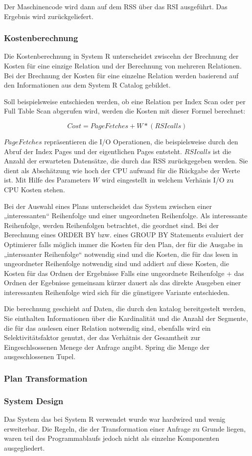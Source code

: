 Der Maschinencode wird dann auf dem \ac{RSS} über das \ac{RSI} ausgeführt.  Das Ergebnis wird zurückgeliefert.

\subsubsection{Kostenberechnung}

Die Kostenberechnung in System R unterscheidet zwiscehn der Brechnung der Kosten für eine einzige Relation und der Berechnung von mehreren Relationen. Bei der Brechnung der Kosten für eine einzelne Relation werden basierend auf den Informationen aus dem System R Catalog gebildet.

Soll beispielsweise entschieden werden, ob eine Relation per Index Scan oder per Full Table Scan abgerufen wird, werden die Kosten mit dieser Formel berechnet:

$$Cost = Page Fetches + W * (RSI calls)$$


$Page Fetches$ repräsentieren die I/O Operationen, die beispielsweise durch den Abruf der Index Pages und der eigentlichen Pages entsteht. $RSI calls$ ist die Anzahl der erwarteten Datensätze, die durch das \ac{RSS} zurückgegeben werden. Sie dient als Abschätzung wie hoch der CPU aufwand für die Rückgabe der Werte ist. Mit Hilfe des Parameters $W$ wird eingestellt in welchem Verhänis I/O zu CPU Kosten stehen.

Bei der Auswahl eines Plans unterscheidet das System zwischen einer „interessanten“ Reihenfolge und einer ungeordneten Reihenfolge. Als interessante Reihenfolge, werden Reihenfolgen betrachtet, die geordnet sind. Bei der Berechnung eines ORDER BY bzw. eines GROUP BY Statements evaluiert der Optimierer falls möglich immer die Kosten für den Plan, der für die Ausgabe in „interssanter Reihenfolge“ notwendig sind und die Kosten, die für das lesen in ungeordneter Reihenfolge notwendig sind und addiert auf diese Kosten, die Kosten für das Ordnen der Ergebnisse Falls eine ungeordnete Reihenfolge + das Ordnen der Egebnisse gemeinsam kürzer dauert als das direkte Ausgeben einer interessanten Reihenfolge wird sich für die günstigere Variante entschieden. 

Die berechnung geschieht auf Daten, die durch den katalog bereitgestelt werden, Sie einthalten Informationen über die Kardinalität und die Anzahl der Segmente, die für das auslesen einer Relation notwendig sind, ebenfalls wird ein Selektivitätsfaktor genutzt, der das Verhätnis der Gesamtheit zur Eingeschlsossenen Menege der Anfrage angibt. Spring die Menge der ausgeschlossenen Tupel. 
\subsubsection{Plan Transformation}

\subsubsection{System Design}
Das System das bei System R verwendet wurde war hardwired und wenig erweiterbar. Die Regeln, die der Transformation einer Anfrage zu Grunde liegen, waren teil des Programmablaufs jedoch nicht als einzelne Komponenten ausgegliedert. 